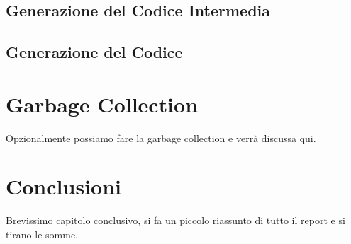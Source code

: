 \documentclass{scrreprt}
\begin{document}
\section{Generazione del Codice Intermedia}
\section{Generazione del Codice}

\chapter{Garbage Collection}
Opzionalmente possiamo fare la garbage collection e verrà discussa qui.

\chapter{Conclusioni}
Brevissimo capitolo conclusivo, si fa un piccolo riassunto di tutto il report e si tirano le somme.
\end{document}

